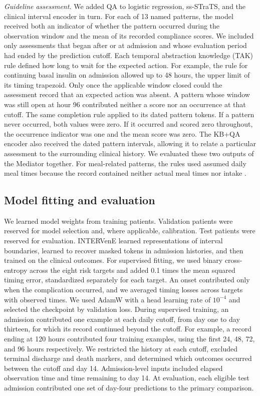 \emph{Guideline assessment.} We added QA to logistic regression, ss-STraTS, and the clinical interval encoder in turn. For each of 13 named patterns, the model received both an indicator of whether the pattern occurred during the observation window and the mean of its recorded compliance scores. We included only assessments that began after or at admission and whose evaluation period had ended by the prediction cutoff. Each temporal abstraction knowledge (TAK) rule defined how long to wait for the expected action. For example, the rule for continuing basal insulin on admission allowed up to 48 hours, the upper limit of its timing trapezoid. Only once the applicable window closed could the assessment record that an expected action was absent. A pattern whose window was still open at hour 96 contributed neither a score nor an occurrence at that cutoff. The same completion rule applied to its dated pattern tokens. If a pattern never occurred, both values were zero. If it occurred and scored zero throughout, the occurrence indicator was one and the mean score was zero. The KB+QA encoder also received the dated pattern intervals, allowing it to relate a particular assessment to the surrounding clinical history. We evaluated these two outputs of the Mediator together. For meal-related patterns, the rules used assumed daily meal times because the record contained neither actual meal times nor intake \citep{oded2027kineret-jbi}.

\subsection{Model fitting and evaluation}
\label{sec:methods-eval}
We learned model weights from training patients. Validation patients were reserved for model selection and, where applicable, calibration. Test patients were reserved for evaluation. INTERVenE learned representations of interval boundaries, learned to recover masked tokens in admission histories, and then trained on the clinical outcomes. For supervised fitting, we used binary cross-entropy across the eight risk targets and added 0.1 times the mean squared timing error, standardized separately for each target. An onset contributed only when the complication occurred, and we averaged timing losses across targets with observed times. We used AdamW with a head learning rate of $10^{-4}$ and selected the checkpoint by validation loss. During supervised training, an admission contributed one example at each daily cutoff, from day one to day thirteen, for which its record continued beyond the cutoff. For example, a record ending at 120 hours contributed four training examples, using the first 24, 48, 72, and 96 hours respectively. We restricted the history at each cutoff, excluded terminal discharge and death markers, and determined which outcomes occurred between the cutoff and day 14. Admission-level inputs included elapsed observation time and time remaining to day 14. At evaluation, each eligible test admission contributed one set of day-four predictions to the primary comparison.

